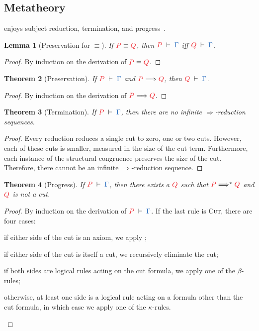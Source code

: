 \documentclass[submission,copyright,creativecommons]{eptcs}
\newtheorem{lemma}{Lemma}[section]
\newtheorem{theorem}[lemma]{Theorem}
\begin{document}
\subsection{Metatheory}
\cp enjoys subject reduction, termination, and progress~\citep{wadler2012}.
\begin{lemma}[Preservation for $\equiv$]\label{lem:cp-preservation-equiv}
  If $\tm{P}\equiv\tm{Q}$, then $\seq[P]{\Gamma}$ iff $\seq[Q]{\Gamma}$.
\end{lemma} 
\begin{proof}
  By induction on the derivation of $\tm{P}\equiv\tm{Q}$.
\end{proof}
\begin{theorem}[Preservation]\label{thm:cp-preservation}
  If $\seq[P]{\Gamma}$ and $\reducesto{P}{Q}$, then $\seq[Q]{\Gamma}$.
\end{theorem} 
\begin{proof}
  By induction on the derivation of $\reducesto{P}{Q}$.
\end{proof}%
\begin{theorem}[Termination]\label{thm:cp-termination}
  If $\seq[P]{\Gamma}$, then there are no infinite $\Longrightarrow$-reduction sequences.
\end{theorem} 
\begin{proof}
  Every reduction reduces a single cut to zero, one or two cuts. However, each of these cuts is smaller, measured in the size of the cut term. Furthermore, each instance of the structural congruence preserves the size of the cut. Therefore, there cannot be an infinite $\Longrightarrow$-reduction sequence.
\end{proof}
\begin{theorem}[Progress]\label{thm:cp-progress}
  If $\seq[P]{\Gamma}$, then there exists a $\tm{Q}$ such that
  $\tm{P}\Longrightarrow^\star\tm{Q}$ and $\tm{Q}$ is not a cut.
\end{theorem} 
\begin{proof}
  By induction on the derivation of $\seq[P]{\Gamma}$. If the last rule is \textsc{Cut}, there are four cases:
  \begin{enumerate*}[label={\alph*)}]
  \item
    if either side of the cut is an axiom, we apply ;
  \item
    if either side of the cut is itself a cut, we recursively eliminate the cut;
  \item
    if both sides are logical rules acting on the cut formula, we apply
    one of the $\beta$-rules;
  \item
    otherwise, at least one side is a logical rule acting on a formula other
    than the cut formula, in which case we apply one of the $\kappa$-rules.
  \end{enumerate*}
\end{proof}%
\end{document}

